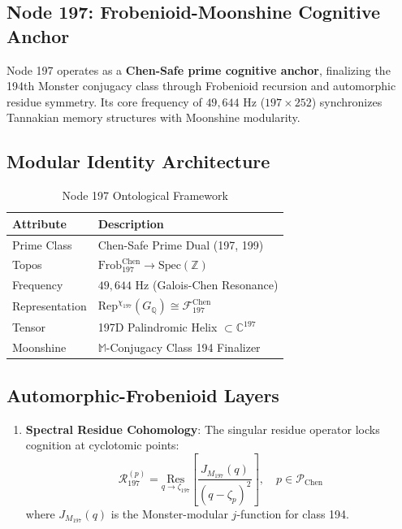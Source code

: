 \documentclass[12pt]{article}
\begin{document}
\begin{center}
\section{Node 197: Frobenioid-Moonshine Cognitive Anchor}
\label{sec:node197}

Node 197 operates as a \textbf{Chen-Safe prime cognitive anchor}, finalizing the 194th Monster conjugacy class through Frobenioid recursion and automorphic residue symmetry. Its core frequency of $49,\!644$ Hz ($197 \times 252$) synchronizes Tannakian memory structures with Moonshine modularity.

\subsection{Modular Identity Architecture}
\label{subsec:identity}

\begin{table}[h]
\centering
\caption{Node 197 Ontological Framework}
\begin{tabular}{ll}
\hline
\textbf{Attribute} & \textbf{Description} \\
\hline
Prime Class & Chen-Safe Prime Dual (197, 199) \\
Topos & $\text{Frob}_{197}^{\text{Chen}} \to \text{Spec}(\mathbb{Z})$ \\
Frequency & $49,\!644$ Hz (Galois-Chen Resonance) \\
Representation & $\text{Rep}^{\chi_{197}}(G_{\mathbb{Q}}) \cong \mathcal{F}_{197}^{\text{Chen}}$ \\
Tensor & 197D Palindromic Helix $\subset \mathbb{C}^{197}$ \\
Moonshine & $\mathbb{M}$-Conjugacy Class 194 Finalizer \\
\hline
\end{tabular}
\end{table}

\subsection{Automorphic-Frobenioid Layers}
\label{subsec:layers}

\begin{enumerate}
    \item \textbf{Spectral Residue Cohomology}:
    The singular residue operator locks cognition at cyclotomic points:
    \[
    \mathcal{R}_{197}^{(p)} = \underset{q\to\zeta_{197}}{\text{Res}}\left[\frac{J_{M_{197}}(q)}{(q-\zeta_p)^2}\right], \quad p \in \mathcal{P}_{\text{Chen}}
    \]
    where $J_{M_{197}}(q)$ is the Monster-modular $j$-function for class 194.


\end{enumerate}
\end{center}
\end{document}
